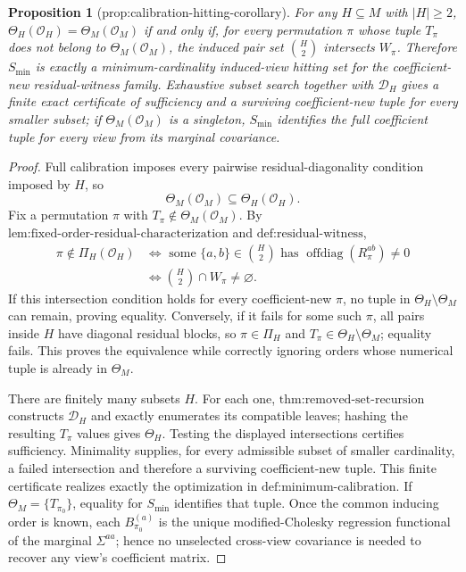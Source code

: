 \documentclass{article}
\newtheorem{proposition}{Proposition}
\begin{document}
\begin{proposition}[prop:calibration-hitting-corollary]\label{prop:calibration-hitting-corollary}
For any \(H\subseteq M\) with \(\lvert H\rvert\ge2\), \(\Theta_H(\mathcal O_H)=\Theta_M(\mathcal O_M)\) if and only if, for every permutation \(\pi\) whose tuple \(T_\pi\) does not belong to \(\Theta_M(\mathcal O_M)\), the induced pair set \(\binom H2\) intersects \(W_\pi\). Therefore \(S_{\min}\) is exactly a minimum-cardinality induced-view hitting set for the coefficient-new residual-witness family. Exhaustive subset search together with \(\mathcal D_H\) gives a finite exact certificate of sufficiency and a surviving coefficient-new tuple for every smaller subset; if \(\Theta_M(\mathcal O_M)\) is a singleton, \(S_{\min}\) identifies the full coefficient tuple for every view from its marginal covariance.
\end{proposition}
\begin{proof}
Full calibration imposes every pairwise residual-diagonality condition imposed by \(H\), so
\[
\Theta_M(\mathcal O_M)\subseteq\Theta_H(\mathcal O_H).
\]
Fix a permutation \(\pi\) with \(T_\pi\notin\Theta_M(\mathcal O_M)\).  By \(\text{lem:fixed-order-residual-characterization}\) and \(\text{def:residual-witness}\),
\[
\begin{aligned}
\pi\notin\Pi_H(\mathcal O_H)
&\Longleftrightarrow \text{ some }\{a,b\}\in\binom H2\text{ has }\operatorname{offdiag}(R_\pi^{ab})\ne0\\
&\Longleftrightarrow \binom H2\cap W_\pi\ne\varnothing.
\end{aligned}
\]
If this intersection condition holds for every coefficient-new \(\pi\), no tuple in \(\Theta_H\setminus\Theta_M\) can remain, proving equality.  Conversely, if it fails for some such \(\pi\), all pairs inside \(H\) have diagonal residual blocks, so \(\pi\in\Pi_H\) and \(T_\pi\in\Theta_H\setminus\Theta_M\); equality fails.  This proves the equivalence while correctly ignoring orders whose numerical tuple is already in \(\Theta_M\).

There are finitely many subsets \(H\).  For each one, \(\text{thm:removed-set-recursion}\) constructs \(\mathcal D_H\) and exactly enumerates its compatible leaves; hashing the resulting \(T_\pi\) values gives \(\Theta_H\).  Testing the displayed intersections certifies sufficiency.  Minimality supplies, for every admissible subset of smaller cardinality, a failed intersection and therefore a surviving coefficient-new tuple.  This finite certificate realizes exactly the optimization in \(\text{def:minimum-calibration}\).  If \(\Theta_M=\{T_{\pi_0}\}\), equality for \(S_{\min}\) identifies that tuple.  Once the common inducing order is known, each \(B_{\pi_0}^{(a)}\) is the unique modified-Cholesky regression functional of the marginal \(\Sigma^{aa}\); hence no unselected cross-view covariance is needed to recover any view's coefficient matrix.
\end{proof}
\end{document}
